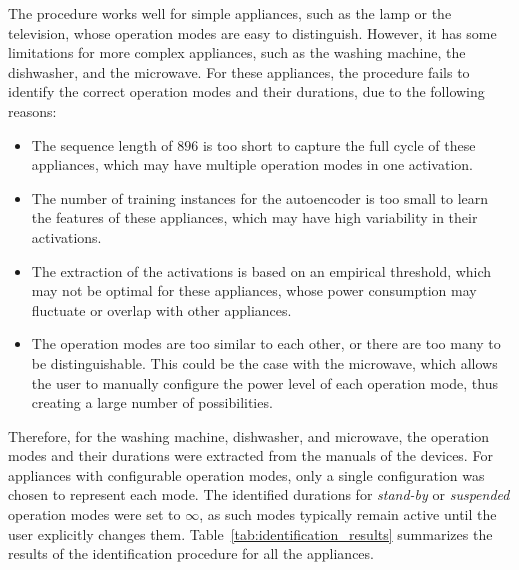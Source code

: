 The procedure works well for simple appliances, such as the lamp or the television, whose operation modes are easy to distinguish. However, it has some limitations for more complex appliances, such as the washing machine, the dishwasher, and the microwave. For these appliances, the procedure fails to identify the correct operation modes and their durations, due to the following reasons:
\begin{itemize}
  \item The sequence length of \(896\) is too short to capture the full cycle of these appliances, which may have multiple operation modes in one activation.
  \item The number of training instances for the autoencoder is too small to learn the features of these appliances, which may have high variability in their activations.
  \item The extraction of the activations is based on an empirical threshold, which may not be optimal for these appliances, whose power consumption may fluctuate or overlap with other appliances.
  \item The operation modes are too similar to each other, or there are too many to be distinguishable. This could be the case with the microwave, which allows the user to manually configure the power level of each operation mode, thus creating a large number of possibilities.
\end{itemize}

Therefore, for the washing machine, dishwasher, and microwave, the operation modes and their durations were extracted from the manuals of the devices. For appliances with configurable operation modes, only a single configuration was chosen to represent each mode. The identified durations for \textit{stand-by} or \textit{suspended} operation modes were set to \(\infty \), as such modes typically remain active until the user explicitly changes them. Table~\ref{tab:identification_results} summarizes the results of the identification procedure for all the appliances.

